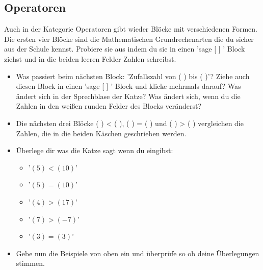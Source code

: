 \documentclass{\VorlagenPfad/coderdojokatext}
\begin{document}
\subsection{Operatoren}
Auch in der Kategorie \textcolor{Ope}{Operatoren} gibt wieder Blöcke mit verschiedenen Formen.
Die ersten vier Blöcke sind die Mathematischen Grundrechenarten die du sicher aus der Schule kennst. Probiere sie aus indem du sie in einen \textcolor{Aus}{'sage [  ] '} Block ziehst und in die beiden leeren Felder Zahlen schreibst.
\begin{itemize}
\item Was passiert beim nächsten Block: \textcolor{Ope}{'Zufallszahl von ( ) bis ( )'}? Ziehe auch diesen Block in einen \textcolor{Aus}{'sage [  ] '} Block und klicke mehrmals darauf? Was ändert sich in der Sprechblase der Katze? Was ändert sich, wenn du die Zahlen in den weißen runden Felder des Blocks veränderst?
\item Die nächsten drei Blöcke \textcolor{Ope}{( ) < ( )}, \textcolor{Ope}{( ) = ( )} und \textcolor{Ope}{( ) > ( )} vergleichen die Zahlen, die in die beiden Käschen geschrieben werden. 
\newline
\item Überlege dir was die Katze sagt wenn du eingibst:
\begin{itemize}
\item \textcolor{Ope}{'$(5) < (10)$'}
\item \textcolor{Ope}{'$(5) = (10)$'}
\item \textcolor{Ope}{'$(4) > (17)$'}
\item \textcolor{Ope}{'$(7) > (-7)$'}
\item \textcolor{Ope}{'$(3) = (3)$'}
\end{itemize} 
\item Gebe nun die Beispiele von oben ein und überprüfe so ob deine Überlegungen stimmen.
\end{itemize}
\end{document}
